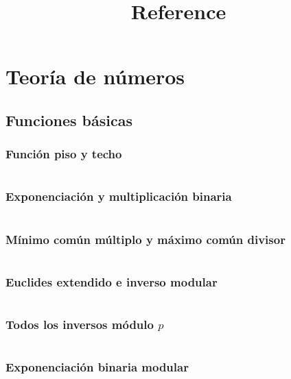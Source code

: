 \documentclass[11pt]{article}
\title{Reference}
\begin{document}
	\tableofcontents
	
	\clearpage
	\section{Teoría de números}
		\subsection{Funciones básicas}
			\subsubsection{Función piso y techo}
			\inputminted[tabsize=2,breaklines,firstline=5,lastline=21,fontsize=\small]{c++}{numberTheory.cpp}
			
			\subsubsection{Exponenciación y multiplicación binaria}
			\inputminted[tabsize=2,breaklines,firstline=23,lastline=46,fontsize=\small]{c++}{numberTheory.cpp}
			
			\subsubsection{Mínimo común múltiplo y máximo común divisor}
			\inputminted[tabsize=2,breaklines,firstline=48,lastline=68,fontsize=\small]{c++}{numberTheory.cpp}
			
			\subsubsection{Euclides extendido e inverso modular}
			\inputminted[tabsize=2,breaklines,firstline=70,lastline=91,fontsize=\small]{c++}{numberTheory.cpp}
			
			\subsubsection{Todos los inversos módulo $p$}
			\inputminted[tabsize=2,breaklines,firstline=742,lastline=749,fontsize=\small]{c++}{numberTheory.cpp}
			
			\subsubsection{Exponenciación binaria modular}
			\inputminted[tabsize=2,breaklines,firstline=93,lastline=106,fontsize=\small]{c++}{numberTheory.cpp}
			
\end{document}

